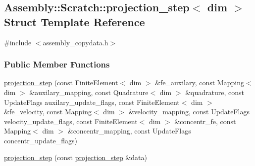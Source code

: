 \hypertarget{struct_assembly_1_1_scratch_1_1projection__step}{}\subsection{Assembly\+:\+:Scratch\+:\+:projection\+\_\+step$<$ dim $>$ Struct Template Reference}
\label{struct_assembly_1_1_scratch_1_1projection__step}


{\ttfamily \#include $<$assembly\+\_\+copydata.\+h$>$}

\subsubsection*{Public Member Functions}
\begin{DoxyCompactItemize}
\item 
\hyperlink{struct_assembly_1_1_scratch_1_1projection__step_ab68aa92ddfce17896f9bb3088cd707fc}{projection\+\_\+step} (const Finite\+Element$<$ dim $>$ \&fe\+\_\+auxilary, const Mapping$<$ dim $>$ \&auxilary\+\_\+mapping, const Quadrature$<$ dim $>$ \&quadrature, const Update\+Flags auxilary\+\_\+update\+\_\+flags, const Finite\+Element$<$ dim $>$ \&fe\+\_\+velocity, const Mapping$<$ dim $>$ \&velocity\+\_\+mapping, const Update\+Flags velocity\+\_\+update\+\_\+flags, const Finite\+Element$<$ dim $>$ \&concentr\+\_\+fe, const Mapping$<$ dim $>$ \&concentr\+\_\+mapping, const Update\+Flags concentr\+\_\+update\+\_\+flags)
\item 
\hyperlink{struct_assembly_1_1_scratch_1_1projection__step_aadd897036cbaca7f3a37e3c0b0289bbc}{projection\+\_\+step} (const \hyperlink{struct_assembly_1_1_scratch_1_1projection__step}{projection\+\_\+step} \&data)
\end{DoxyCompactItemize}
